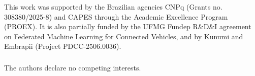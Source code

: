 \documentclass[runningheads]{llncs}
\begin{document}
%
%
%
%
%
%








\begin{credits}
\subsubsection{\ackname} This work was supported by the Brazilian agencies CNPq (Grants no. 308380/2025-8) and CAPES through the Academic Excellence Program (PROEX). It is also partially funded by the UFMG Fundep R\&D\&I agreement on Federated Machine Learning for Connected Vehicles, and by Kunumi and Embrapii (Project PDCC-2506.0036).

\subsubsection{\discintname}
The authors declare no competing interests.
\end{credits}



\end{document}
